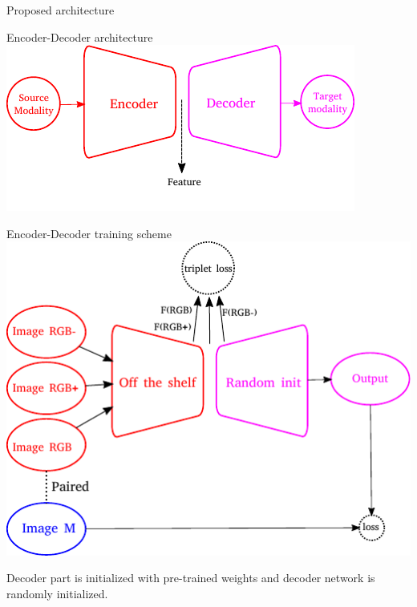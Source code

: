 \begin{frame}{Proposed architecture}	
	\begin{minipage}[c]{0.48\linewidth}
		\begin{block}{Encoder-Decoder architecture}
			\includegraphics[width=\linewidth]{vect/encoderdecoder.pdf}					
		\end{block}
	\end{minipage}
	\hfill
	\begin{minipage}[c]{0.48\linewidth}
		\begin{block}{Encoder-Decoder training scheme}
			\includegraphics[width=\linewidth]{vect/encoderdecoder_training.pdf}	
		\end{block}
	\end{minipage}
	\vfill
	Decoder part is initialized with pre-trained weights and decoder network is randomly initialized.				
\end{frame}